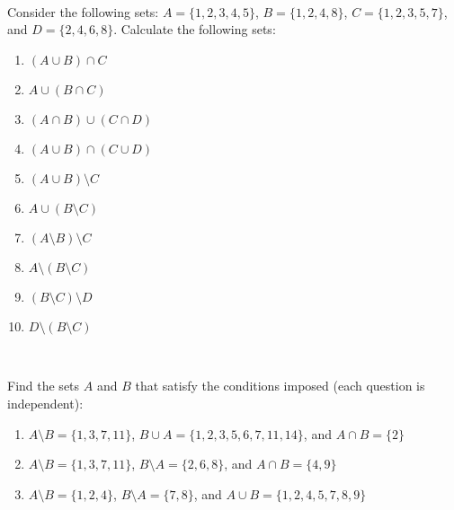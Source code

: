 \documentclass[11pt]{article}
\newcommand{\myset}[1]{\{#1\}}
\begin{document}
~\\[-6mm]

\begin{myExercise}
Consider the following sets: $A = \myset{1,2,3,4,5}$, $B = \myset{1,2,4,8}$, $C = \myset{1,2,3,5,7}$, and $D = \myset{2,4,6,8}$. Calculate the following sets:
\begin{enumerate}[label=(\alph*)]
\item $(A \cup B)  \cap C$
\item $A \cup (B \cap C)$
\item $(A \cap B) \cup (C \cap D)$
\item $(A \cup B) \cap (C \cup D)$
\item $(A \cup B) \setminus C$
\item $A \cup (B \setminus C)$
\item $(A \setminus B) \setminus C$
\item $A \setminus (B \setminus C)$
\item $(B \setminus C) \setminus D$
\item $D \setminus (B \setminus C)$
\end{enumerate}

\end{myExercise}

~\\[-6mm]

\begin{myExercise}
  
  Find the sets $A$ and $B$ that satisfy the conditions imposed (each question is independent):
  
  \begin{enumerate}[label=(\alph*)]
    \item $A \setminus B = \myset{1,3,7,11}$, $B \cup A = \myset{1,2,3,5,6,7,11,14}$, and $A \cap B = \myset{2}$  
    \item $A \setminus B = \myset{1,3,7,11}$, $B \setminus A = \myset{2,6,8}$, and $A \cap B = \myset{4,9}$  
    \item $A \setminus B = \myset{1,2,4}$, $B \setminus A = \myset{7,8}$, and $A \cup B = \myset{1,2,4,5,7,8,9}$  
  \end{enumerate}

\end{myExercise}

~\\[-6mm]
\end{document}

